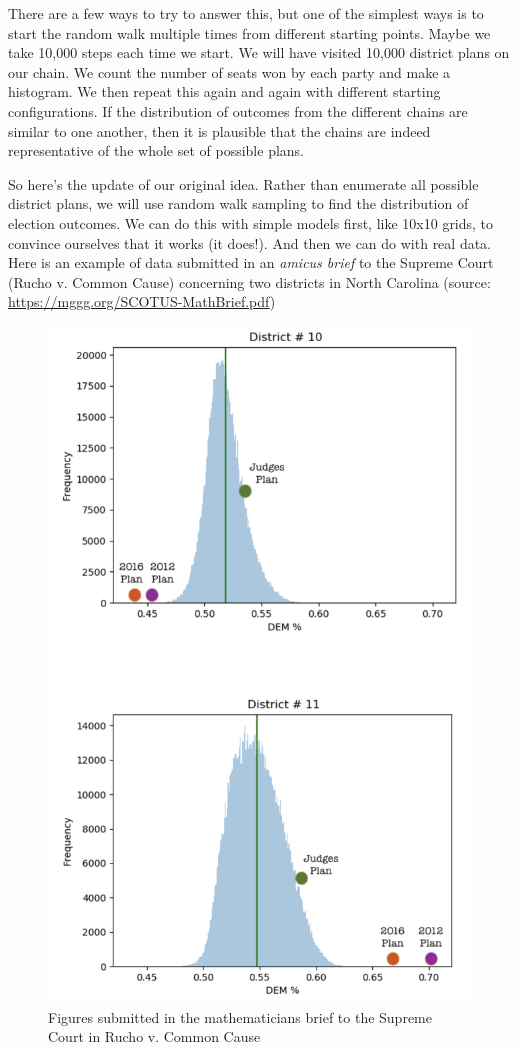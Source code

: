 \documentclass[
  openany]{book}
\begin{document}
There are a few ways to try to answer this, but one of the simplest ways is to start the random walk multiple times from different starting points. Maybe we take 10,000 steps each time we start. We will have visited 10,000 district plans on our chain. We count the number of seats won by each party and make a histogram. We then repeat this again and again with different starting configurations. If the distribution of outcomes from the different chains are similar to one another, then it is plausible that the chains are indeed representative of the whole set of possible plans.

So here's the update of our original idea. Rather than enumerate all possible district plans, we will use random walk sampling to find the distribution of election outcomes. We can do this with simple models first, like 10x10 grids, to convince ourselves that it works (it does!). And then we can do with real data. Here is an example of data submitted in an \emph{amicus brief} to the Supreme Court (Rucho v. Common Cause) concerning two districts in North Carolina (source: \url{https://mggg.org/SCOTUS-MathBrief.pdf})

\begin{figure}

{\centering \includegraphics[width=0.9\linewidth]{images/amicus_NCdist}

}

\caption{Figures submitted in the mathematicians brief to the Supreme Court in Rucho v. Common Cause}\label{fig:amicus-NC}
\end{figure}
\end{document}
